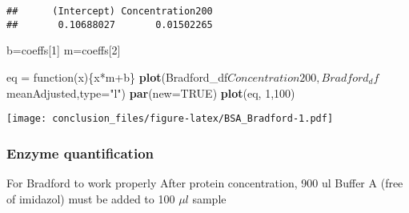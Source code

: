 \documentclass[]{article}
\newenvironment{Shaded}{\begin{snugshade}}{\end{snugshade}}
\newcommand{\KeywordTok}[1]{\textcolor[rgb]{0.13,0.29,0.53}{\textbf{{#1}}}}
\newcommand{\DataTypeTok}[1]{\textcolor[rgb]{0.13,0.29,0.53}{{#1}}}
\newcommand{\DecValTok}[1]{\textcolor[rgb]{0.00,0.00,0.81}{{#1}}}
\newcommand{\StringTok}[1]{\textcolor[rgb]{0.31,0.60,0.02}{{#1}}}
\newcommand{\OtherTok}[1]{\textcolor[rgb]{0.56,0.35,0.01}{{#1}}}
\newcommand{\NormalTok}[1]{{#1}}
\begin{document}
\begin{verbatim}
##      (Intercept) Concentration200 
##       0.10688027       0.01502265
\end{verbatim}

\begin{Shaded}
\begin{Highlighting}[]
\NormalTok{b=coeffs[}\DecValTok{1}\NormalTok{]}
\NormalTok{m=coeffs[}\DecValTok{2}\NormalTok{]}

\NormalTok{eq =}\StringTok{ }\NormalTok{function(x)\{x*m+b\}}
\KeywordTok{plot}\NormalTok{(Bradford_df$Concentration200,Bradford_df$meanAdjusted,}\DataTypeTok{type=}\StringTok{"l"}\NormalTok{)}
\KeywordTok{par}\NormalTok{(}\DataTypeTok{new=}\OtherTok{TRUE}\NormalTok{)}
\KeywordTok{plot}\NormalTok{(eq, }\DecValTok{1}\NormalTok{,}\DecValTok{100}\NormalTok{)}
\end{Highlighting}
\end{Shaded}

\texttt{[image: conclusion\_files/figure-latex/BSA\_Bradford-1.pdf]}

\subsubsection{Enzyme quantification}\label{enzyme-quantification}

For Bradford to work properly After protein concentration, 900 ul Buffer
A (free of imidazol) must be added to 100 \(\mu l\) sample
\end{document}

